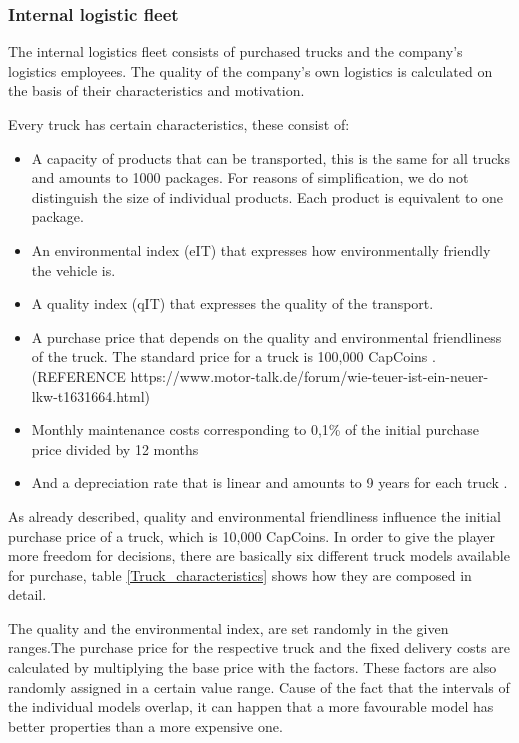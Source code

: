 \subsubsection{Internal logistic fleet}
The internal logistics fleet consists of purchased trucks and the company's logistics employees. The quality of the company's own logistics is calculated on the basis of their characteristics and motivation.

Every truck has certain characteristics, these consist of:
\begin{itemize}
    \item A capacity of products that can be transported, this is the same for all trucks and amounts to 1000 packages. For reasons of simplification, we do not distinguish the size of individual products.  Each product is equivalent to one package. 
    \item An environmental index (\gls{eIT}) that expresses how environmentally friendly the vehicle is.
    \item A quality index (\gls{qIT}) that expresses the quality of the transport.
    \item A purchase price that depends on the quality and environmental friendliness of the truck. The standard price for a truck is 100,000 CapCoins \cite{televon_wie_nodate}.
    (REFERENCE https://www.motor-talk.de/forum/wie-teuer-ist-ein-neuer-lkw-t1631664.html)
    \item Monthly maintenance costs corresponding to 0,1\% of the initial purchase price divided by 12 months
    \item And a depreciation rate that is linear and amounts to 9 years for each truck \cite{noauthor_amtliche_nodate}.
\end{itemize}

As already described, quality and environmental friendliness influence the initial purchase price of a truck, which is 10,000 CapCoins. In order to give the player more freedom for decisions, there are basically six different truck models available for purchase, table \ref{Truck_characteristics} shows how they are composed in detail. 

The quality and the environmental index, are set randomly in the given ranges.The purchase price for the respective truck and the fixed delivery costs are calculated by multiplying the base price with the factors. These factors are also randomly assigned in a certain value range. Cause of the fact that the intervals of the individual models overlap, it can happen that a more favourable model has better properties than a more expensive one.


